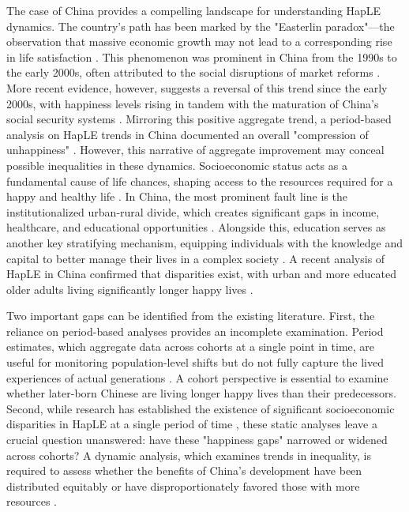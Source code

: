 \documentclass[12pt, a4paper]{article}
\begin{document}
The case of China provides a compelling landscape for understanding HapLE dynamics. The country's path has been marked by the "Easterlin paradox"—the observation that massive economic growth may not lead to a corresponding rise in life satisfaction \autocite{easterlin.1974.does}. This phenomenon was prominent in China from the 1990s to the early 2000s, often attributed to the social disruptions of market reforms \autocite{easterlin.2012.chinas,graham.2017.happiness,knight.2011.does}. More recent evidence, however, suggests a reversal of this trend since the early 2000s, with happiness levels rising in tandem with the maturation of China’s social security systems \autocite{cai.2023.does,wang.2023.hierarchical}. Mirroring this positive aggregate trend, a period-based analysis on HapLE trends in China documented an overall "compression of unhappiness" \autocite{duan.2020.happy}. However, this narrative of aggregate improvement may conceal possible inequalities in these dynamics. Socioeconomic status acts as a fundamental cause of life chances, shaping access to the resources required for a happy and healthy life \autocite{link.1995.social}. In China, the most prominent fault line is the institutionalized urban-rural divide, which creates significant gaps in income, healthcare, and educational opportunities \autocite{guo.2024.regional,liu.2019.are}. Alongside this, education serves as another key stratifying mechanism, equipping individuals with the knowledge and capital to better manage their lives in a complex society \autocite{cheng.2021.sociodemographic}. A recent analysis of HapLE in China confirmed that disparities exist, with urban and more educated older adults living significantly longer happy lives \autocite{wan.2024.socioeconomic}.

Two important gaps can be identified from the existing literature. First, the reliance on period-based analyses provides an incomplete examination. Period estimates, which aggregate data across cohorts at a single point in time, are useful for monitoring population-level shifts but do not fully capture the lived experiences of actual generations \autocite{payne.2022.expansion}. A cohort perspective is essential to examine whether later-born Chinese are living longer happy lives than their predecessors. Second, while research has established the existence of significant socioeconomic disparities in HapLE at a single period of time \autocite{wan.2024.socioeconomic}, these static analyses leave a crucial question unanswered: have these "happiness gaps" narrowed or widened across cohorts? A dynamic analysis, which examines trends in inequality, is required to assess whether the benefits of China's development have been distributed equitably or have disproportionately favored those with more resources \autocite{liu.2019.are}.
\end{document}
